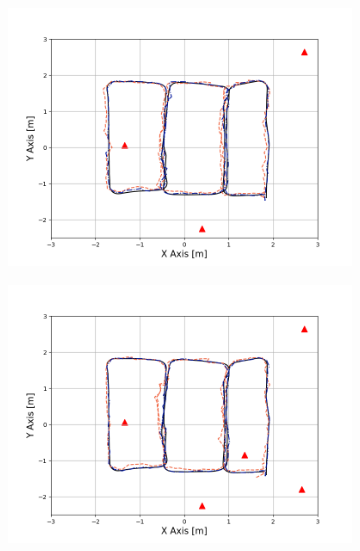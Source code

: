 \documentclass[letterpaper, 10 pt, conference]{ieeeconf}  %
\begin{document}
\begin{figure}[h]
	\centering
	\begin{subfigure}[b]{0.32\textwidth}
		\includegraphics[width=\textwidth]{image/trajectory_3}
		\caption{}
		\label{fig:anchor_3}
	\end{subfigure}
	\begin{subfigure}[b]{0.32\textwidth}
		\includegraphics[width=\textwidth]{image/trajectory_5}
		\caption{}
		\label{fig:anchor_5}
	\end{subfigure}

\end{figure}
\end{document}
